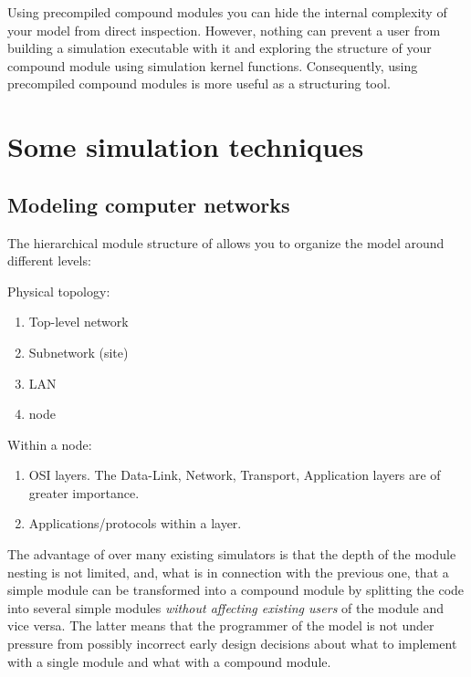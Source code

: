 Using precompiled compound modules
you can hide the internal complexity of your model from direct
inspection. However, nothing can prevent a user from building a
simulation executable with it and exploring the structure of your
compound module using {\opp} simulation kernel
functions. Consequently, using precompiled
compound modules is more useful as a
structuring tool.



\section{Some simulation techniques}

\subsection{Modeling computer networks}

The hierarchical module structure of {\opp} allows you to organize
the model around different levels:

Physical topology:
\begin{enumerate}
\item{Top-level network}
\item{Subnetwork (site)}
\item{LAN}
\item{node}
\end{enumerate}

Within a node:
\begin{enumerate}
\item{OSI layers. The Data-Link, Network, Transport, Application layers
are of greater importance.}
\item{Applications/protocols within a layer.}
\end{enumerate}

The advantage of {\opp} over many existing simulators is that the
depth of the module nesting is not
limited, and, what is in connection with the previous one, that a
simple module can be transformed into a
compound module by splitting the code into
several simple modules \textit{without affecting
  existing users} of the module and vice versa. The latter means that
the programmer of the model is not under pressure from possibly
incorrect early design decisions about what to implement with a single
module and what with a compound module.



